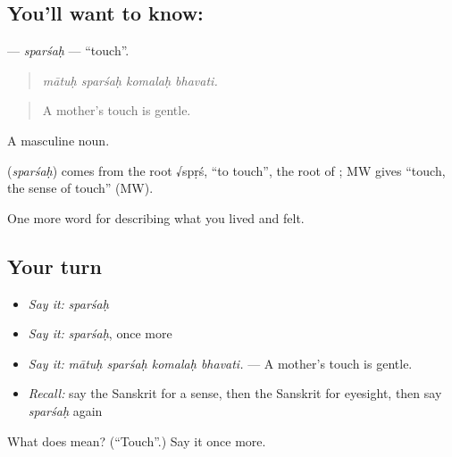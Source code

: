 \subsection*{You'll want to know: }
\textbf{} — \emph{sparśaḥ} — \textquotedblleft{}touch\textquotedblright{}.

\begin{quote}
   
\end{quote}

\begin{quote}
\emph{mātuḥ sparśaḥ komalaḥ bhavati.}
\end{quote}

\begin{quote}
A mother's touch is gentle.
\end{quote}

A masculine noun.

\begin{cousinweb}
\textbf{} (\emph{sparśaḥ}) comes from the root √spṛś, \textquotedblleft{}to touch\textquotedblright{}, the root of \textbf{}; MW gives \textquotedblleft{}touch, the sense of touch\textquotedblright{} (MW).
\end{cousinweb}

\begin{grammarlens}[title={What you've built}]
One more word for describing what you lived and felt.
\end{grammarlens}

\subsection*{Your turn}
\begin{itemize}
\raggedright
  \item \emph{Say it:} \emph{sparśaḥ}
  \item \emph{Say it:} \emph{sparśaḥ}, once more
  \item \emph{Say it:} \emph{mātuḥ sparśaḥ komalaḥ bhavati.} — A mother's touch is gentle.
  \item \emph{Recall:} say the Sanskrit for a sense, then the Sanskrit for eyesight, then say \emph{sparśaḥ} again
\end{itemize}

\begin{tcolorbox}[breakable,colback=teal!4,colframe=teal!35!black,title={Before you move on}]
What does  mean? (\textquotedblleft{}Touch\textquotedblright{}.) Say it once more.
\end{tcolorbox}
